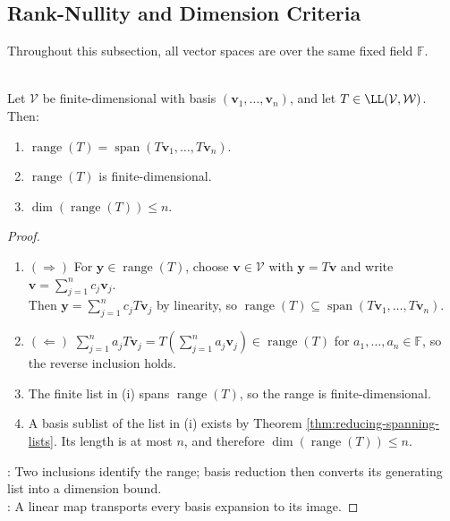 \subsection{Rank-Nullity and Dimension Criteria}
Throughout this subsection, all vector spaces are over the same fixed field $\mathbb{F}$.

\begin{theorem} \label{thm:range-spanned-by-images-of-basis} \\
Let $\mathcal{V}$ be finite-dimensional with basis $(\mathbf{v}_1,\ldots,\mathbf{v}_n)$, and let $T\in\LL(\mathcal{V},\mathcal{W})$. Then:
\begin{enumerate}[label=(\roman*)]
\setlength{\itemsep}{0pt}
\item $\operatorname{range}(T)=\operatorname{span}(T\mathbf{v}_1,\ldots,T\mathbf{v}_n)$.
\item $\operatorname{range}(T)$ is finite-dimensional.
\item $\dim(\operatorname{range}(T))\leq n$.
\end{enumerate}
\begin{proof}
\begin{enumerate}[label=(\roman*)]
\setlength{\itemsep}{0pt}
\item[$(i)$]$(\Rightarrow)$ For $\mathbf{y}\in\operatorname{range}(T)$, choose $\mathbf{v}\in\mathcal{V}$ with $\mathbf{y}=T\mathbf{v}$ and write $\mathbf{v}=\sum\limits_{j=1}^{n}c_j\mathbf{v}_j$.\\
Then $\mathbf{y}=\sum\limits_{j=1}^{n}c_jT\mathbf{v}_j$ by linearity, so $\operatorname{range}(T)\subseteq\operatorname{span}(T\mathbf{v}_1,\ldots,T\mathbf{v}_n)$. 
\item[$(i)$]$(\Leftarrow)$ $\sum\limits_{j=1}^{n}a_jT\mathbf{v}_j=T(\sum\limits_{j=1}^{n}a_j\mathbf{v}_j)\in\operatorname{range}(T)$ for $a_1,\ldots,a_n\in\mathbb{F}$, so the reverse inclusion holds.
\item[$(ii)$] The finite list in (i) spans $\operatorname{range}(T)$, so the range is finite-dimensional.
\item A basis sublist of the list in (i) exists by Theorem \ref{thm:reducing-spanning-lists}. Its length is at most $n$, and therefore $\dim(\operatorname{range}(T))\leq n$.
\end{enumerate}
: Two inclusions identify the range; basis reduction then converts its generating list into a dimension bound.\\
: A linear map transports every basis expansion to its image.
\end{proof}
\end{theorem}

